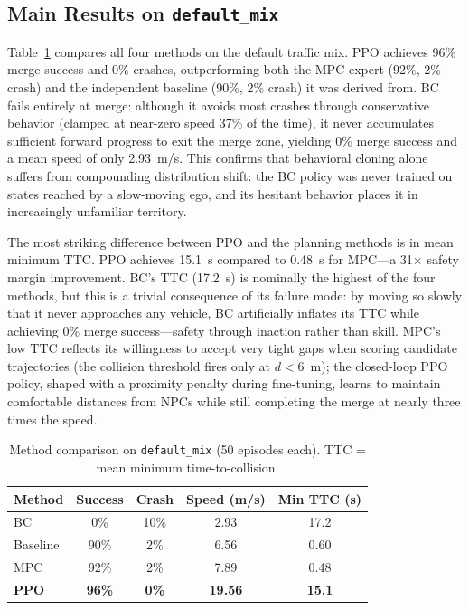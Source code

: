 \documentclass[conference]{IEEEtran}
\begin{document}
\subsection{Main Results on \texttt{default\_mix}}

Table~\ref{tab:main} compares all four methods on the default traffic mix.
PPO achieves 96\% merge success and 0\% crashes, outperforming both the
MPC expert (92\%, 2\% crash) and the independent baseline (90\%, 2\% crash)
it was derived from.
BC fails entirely at merge: although it avoids most crashes through
conservative behavior (clamped at near-zero speed 37\% of the time), it
never accumulates sufficient forward progress to exit the merge zone,
yielding 0\% merge success and a mean speed of only 2.93~m/s.
This confirms that behavioral cloning alone suffers from compounding
distribution shift: the BC policy was never trained on states reached by
a slow-moving ego, and its hesitant behavior places it in increasingly
unfamiliar territory.

The most striking difference between PPO and the planning methods is in
mean minimum TTC.
PPO achieves 15.1~s compared to 0.48~s for MPC---a 31$\times$ safety
margin improvement.
BC's TTC (17.2~s) is nominally the highest of the four methods, but this
is a trivial consequence of its failure mode: by moving so slowly that it
never approaches any vehicle, BC artificially inflates its TTC while
achieving 0\% merge success---safety through inaction rather than skill.
MPC's low TTC reflects its willingness to accept very tight gaps when
scoring candidate trajectories (the collision threshold fires only at
$d < 6$~m); the closed-loop PPO policy, shaped with a proximity penalty
during fine-tuning, learns to maintain comfortable distances from NPCs
while still completing the merge at nearly three times the speed.

\begin{table}[t]
  \caption{Method comparison on \texttt{default\_mix} (50 episodes each).
    TTC = mean minimum time-to-collision.}
  \label{tab:main}
  \centering
  \begin{tabular}{lcccc}
    \toprule
    Method & Success & Crash & Speed (m/s) & Min TTC (s) \\
    \midrule
    BC        &  0\% & 10\% &  2.93 & 17.2 \\
    Baseline  & 90\% &  2\% &  6.56 &  0.60 \\
    MPC       & 92\% &  2\% &  7.89 &  0.48 \\
    \textbf{PPO} & \textbf{96\%} & \textbf{0\%} & \textbf{19.56} & \textbf{15.1} \\
    \bottomrule
  \end{tabular}
\end{table}
\end{document}
